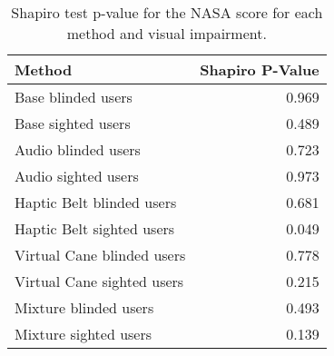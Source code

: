 
\begin{table}[!htb]
\centering
\caption{Shapiro test p-value for the NASA score for each method and visual impairment.}
\label{tab:shapiro_nasa_score}
\begin{tabular}{lr}
\toprule
                    Method &  Shapiro P-Value \\
\midrule
        Base blinded users &            0.969 \\
        Base sighted users &            0.489 \\
       Audio blinded users &            0.723 \\
       Audio sighted users &            0.973 \\
 Haptic Belt blinded users &            0.681 \\
 Haptic Belt sighted users &            0.049 \\
Virtual Cane blinded users &            0.778 \\
Virtual Cane sighted users &            0.215 \\
     Mixture blinded users &            0.493 \\
     Mixture sighted users &            0.139 \\
\bottomrule
\end{tabular}
\end{table}

